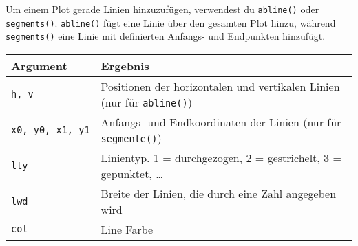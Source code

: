 \documentclass[
]{book}
\begin{document}
Um einem Plot gerade Linien hinzuzufügen, verwendest du \texttt{abline()} oder \texttt{segments()}. \texttt{abline()} fügt eine Linie über den gesamten Plot hinzu,
während \texttt{segments()} eine Linie mit definierten Anfangs- und Endpunkten hinzufügt.

\begin{longtable}[]{@{}ll@{}}
\toprule
\begin{minipage}[b]{0.18\columnwidth}\raggedright
Argument\strut
\end{minipage} & \begin{minipage}[b]{0.76\columnwidth}\raggedright
Ergebnis\strut
\end{minipage}\tabularnewline
\midrule
\endhead
\begin{minipage}[t]{0.18\columnwidth}\raggedright
\texttt{h,\ v}\strut
\end{minipage} & \begin{minipage}[t]{0.76\columnwidth}\raggedright
Positionen der horizontalen und vertikalen Linien (nur für \texttt{abline()})\strut
\end{minipage}\tabularnewline
\begin{minipage}[t]{0.18\columnwidth}\raggedright
\texttt{x0,\ y0,\ x1,\ y1}\strut
\end{minipage} & \begin{minipage}[t]{0.76\columnwidth}\raggedright
Anfangs- und Endkoordinaten der Linien (nur für \texttt{segmente()})\strut
\end{minipage}\tabularnewline
\begin{minipage}[t]{0.18\columnwidth}\raggedright
\texttt{lty}\strut
\end{minipage} & \begin{minipage}[t]{0.76\columnwidth}\raggedright
Linientyp. 1 = durchgezogen, 2 = gestrichelt, 3 = gepunktet, \ldots{}\strut
\end{minipage}\tabularnewline
\begin{minipage}[t]{0.18\columnwidth}\raggedright
\texttt{lwd}\strut
\end{minipage} & \begin{minipage}[t]{0.76\columnwidth}\raggedright
Breite der Linien, die durch eine Zahl angegeben wird\strut
\end{minipage}\tabularnewline
\begin{minipage}[t]{0.18\columnwidth}\raggedright
\texttt{col}\strut
\end{minipage} & \begin{minipage}[t]{0.76\columnwidth}\raggedright
Line Farbe\strut
\end{minipage}\tabularnewline
\bottomrule
\end{longtable}
\end{document}
